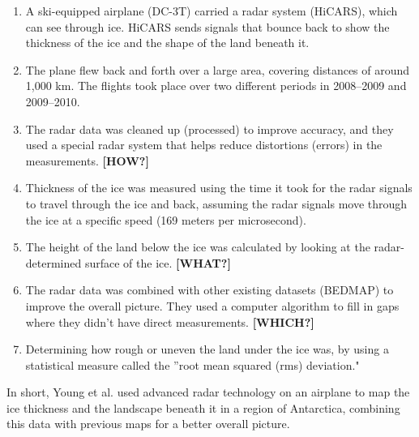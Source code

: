 \begin{enumerate}
    \item A ski-equipped airplane (DC-3T) carried a radar system (HiCARS), which can see through ice. HiCARS sends signals that bounce back to show the thickness of the ice and the shape of the land beneath it.
    \item The plane flew back and forth over a large area, covering distances of around 1,000 km. The flights took place over two different periods in 2008–2009 and 2009–2010.
    \item The radar data was cleaned up (processed) to improve accuracy, and they used a special radar system that helps reduce distortions (errors) in the measurements. \textbf{[HOW?]}
    \item Thickness of the ice was measured using the time it took for the radar signals to travel through the ice and back, assuming the radar signals move through the ice at a specific speed (169 meters per microsecond).
    \item The height of the land below the ice was calculated by looking at the radar-determined surface of the ice. \textbf{[WHAT?]}
    \item The radar data was combined with other existing datasets (BEDMAP) to improve the overall picture. They used a computer algorithm to fill in gaps where they didn’t have direct measurements. \textbf{[WHICH?]}
    \item Determining how rough or uneven the land under the ice was, by using a statistical measure called the ''root mean squared (rms) deviation."
\end{enumerate}
In short, Young et al. used advanced radar technology on an airplane to map the ice thickness and the landscape beneath it in a region of Antarctica, combining this data with previous maps for a better overall picture.
